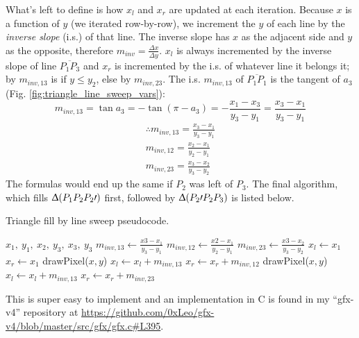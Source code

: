 \documentclass[a4paper]{article}
\begin{document}
What's left to define is how $x_l$ and $x_r$ are updated at each iteration. Because $x$ is a function of $y$ (we iterated row-by-row), we increment the $y$ of each line by the \textit{inverse slope} (i.s.) of that line. The inverse slope has $x$ as the adjacent side and $y$ as the opposite, therefore $m_{inv} = \tfrac{\Delta x}{\Delta y}$. $x_l$ is always incremented by the inverse slope of line $\overline{P_1P_3}$ and $x_r$ is incremented by the i.s. of whatever line it belongs it; by $m_{inv,13}$ is if $y \leq y_2$, else by $m_{inv,23}$. The i.s. $m_{inv,13}$ of $\overline{P_1P_1}$ is the tangent of $a_3$ (Fig. \ref{fig:triangle_line_sweep_vars}):
\[
m_{inv,13} = \tan{a_3} = -\tan(\pi - a_3) = -\frac{x_1-x_3}{y_3-y_1} = \frac{x_3-x_1}{y_3-y_1}
\]
\begin{align*}
\therefore
    m_{inv,13} = \frac{x_3-x_1}{y_3-y_1}\\
    m_{inv,12} = \frac{x_2-x_1}{y_2-y_1}\\
    m_{inv,23} = \frac{x_3-x_2}{y_3-y_2}
\end{align*} 
The formulas would end up the same if $P_2$ was left of $P_3$. The final algorithm, which fills $\Updelta (P_1P_2P_2\prime)$ first, followed by $\Updelta ( P_2\prime P_2P_3)$ is listed below.

\begin{algorithm}[H]
\caption{Triangle fill by line sweep pseudocode.}
\begin{algorithmic}[1]
 {$x_1,\ y_1,\ x_2,\ y_3,\ x_3,\ y_3$} 
    \State $m_{inv,13} \leftarrow \frac{x3-x_1}{y_3 - y_1}$
    \State $m_{inv,12} \leftarrow \frac{x2-x_1}{y_2 - y_1}$
    \State $m_{inv,23} \leftarrow \frac{x3-x_2}{y_3 - y_2}$
    \State $x_l \leftarrow x_1$
    \State $x_r \leftarrow x_1$
     
         
            \State drawPixel($x,y$)
        \EndFor
        \State $x_l \leftarrow x_l + m_{inv,13}$
        \State $x_r \leftarrow x_r + m_{inv,12}$
    \EndFor
     
            \State drawPixel($x,y$)
        \EndFor
        \State $x_l \leftarrow x_l +  m_{inv,13}$
        \State $x_r \leftarrow x_r +  m_{inv,23}$
    \EndFor
\EndProcedure
\end{algorithmic}
\label{alg:triangle_fill_line_sweep}
\end{algorithm}
This is super easy to implement and an implementation in C is found in my ``gfx-v4'' repository at \url{https://github.com/0xLeo/gfx-v4/blob/master/src/gfx/gfx.c#L395}.
\end{document}
